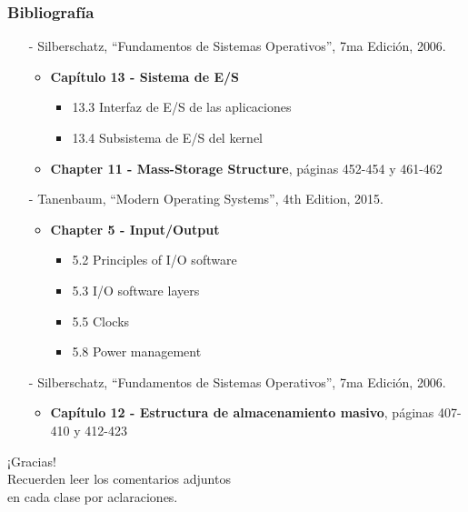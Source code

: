 \documentclass[aspectratio=169]{beamer}
\begin{document}
\begin{frame}[fragile]
    \frametitle{Bibliografía}
    \begin{itemize}
        \setlength\itemsep{0.5cm}
        \item[-] \small Silberschatz, ``Fundamentos de Sistemas Operativos'', 7ma Edición, 2006.\\
        \begin{itemize}
            \item \textbf{Capítulo 13 - Sistema de E/S}
            \begin{itemize}
                \item 13.3 Interfaz de E/S de las aplicaciones
                \item 13.4 Subsistema de E/S del kernel
            \end{itemize}
            \item \textbf{Chapter 11 - Mass-Storage Structure}, páginas 452-454 y 461-462
        \end{itemize}
        \item[-] \small Tanenbaum, ``Modern Operating Systems'', 4th Edition, 2015.\\
        \begin{itemize}
            \item \textbf{Chapter 5 - Input/Output}
            \begin{itemize}
                \item 5.2 Principles of I/O software
                \item 5.3 I/O software layers
                \item 5.5 Clocks
                \item 5.8 Power management
            \end{itemize}
        \end{itemize}
        \item[-] \small Silberschatz, ``Fundamentos de Sistemas Operativos'', 7ma Edición, 2006.\\
        \begin{itemize}
            \item \textbf{Capítulo 12 - Estructura de almacenamiento masivo}, páginas 407-410 y 412-423
        \end{itemize}
    \end{itemize}
\end{frame}

\begin{frame}[plain]
    \begin{center}
    \vspace{2cm}
    \huge ¡Gracias!\\
    \vspace{2cm}
    \normalsize Recuerden leer los comentarios adjuntos\\ en cada clase por aclaraciones.
    \end{center}
\end{frame}
\end{document}
